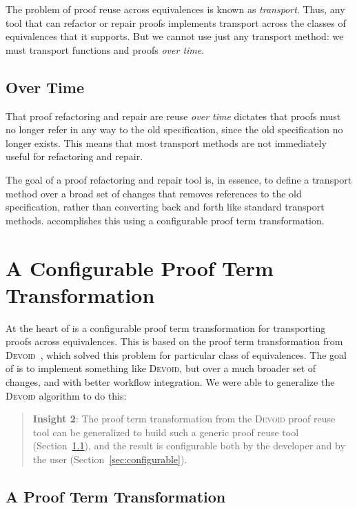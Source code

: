 The problem of proof reuse across equivalences is known as \textit{transport}. %
Thus, any tool that can refactor or repair proofs implements transport across the classes
of equivalences that it supports.
But we cannot use just any transport method: we must transport functions and proofs \textit{over time}.

\subsection{Over Time}
\label{sec:time}

That proof refactoring and repair are reuse \textit{over time} dictates that proofs
must no longer refer in any way to the old specification, since the old specification no longer exists.
This means that most transport methods %
are not immediately useful for refactoring and repair.

The goal of a proof refactoring and repair tool is, in essence, to
define a transport method over a broad set of changes that
removes references to the old specification, rather than converting back and forth
like standard transport methods.
\toolname accomplishes this using a configurable proof term transformation.

\section{A Configurable Proof Term Transformation}
\label{sec:key2}

At the heart of \toolname is a configurable proof term transformation for transporting
proofs across equivalences. This is based on the proof term transformation from 
\textsc{Devoid}~\cite{Ringer2019}, which solved this problem for particular class of equivalences.
The goal of \toolname is to implement something like \textsc{Devoid}, but over
a much broader set of changes, and with better workflow integration.
We were able to generalize the \textsc{Devoid} algorithm to do this:

\begin{quote}
\textbf{Insight 2}:
The proof term transformation from the \textsc{Devoid} proof reuse tool can be generalized
to build such a generic proof reuse tool (Section~\ref{sec:generic}),
and the result is configurable both by the developer and by the user (Section~\ref{sec:configurable}).
\end{quote}

\subsection{A Proof Term Transformation}
\label{sec:generic}

